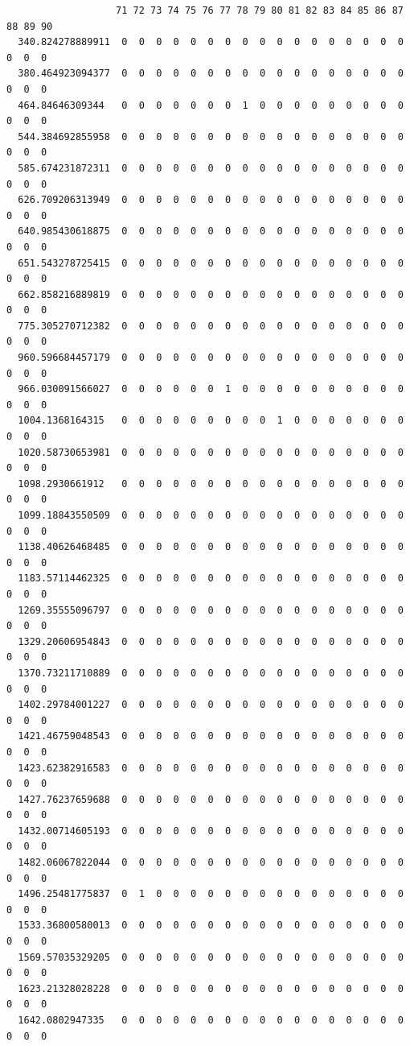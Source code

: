 \documentclass[
  letterpaper,
  DIV=11,
  numbers=noendperiod]{scrartcl}
\begin{document}
\begin{verbatim}
                   71 72 73 74 75 76 77 78 79 80 81 82 83 84 85 86 87 88 89 90
  340.824278889911  0  0  0  0  0  0  0  0  0  0  0  0  0  0  0  0  0  0  0  0
  380.464923094377  0  0  0  0  0  0  0  0  0  0  0  0  0  0  0  0  0  0  0  0
  464.84646309344   0  0  0  0  0  0  0  1  0  0  0  0  0  0  0  0  0  0  0  0
  544.384692855958  0  0  0  0  0  0  0  0  0  0  0  0  0  0  0  0  0  0  0  0
  585.674231872311  0  0  0  0  0  0  0  0  0  0  0  0  0  0  0  0  0  0  0  0
  626.709206313949  0  0  0  0  0  0  0  0  0  0  0  0  0  0  0  0  0  0  0  0
  640.985430618875  0  0  0  0  0  0  0  0  0  0  0  0  0  0  0  0  0  0  0  0
  651.543278725415  0  0  0  0  0  0  0  0  0  0  0  0  0  0  0  0  0  0  0  0
  662.858216889819  0  0  0  0  0  0  0  0  0  0  0  0  0  0  0  0  0  0  0  0
  775.305270712382  0  0  0  0  0  0  0  0  0  0  0  0  0  0  0  0  0  0  0  0
  960.596684457179  0  0  0  0  0  0  0  0  0  0  0  0  0  0  0  0  0  0  0  0
  966.030091566027  0  0  0  0  0  0  1  0  0  0  0  0  0  0  0  0  0  0  0  0
  1004.1368164315   0  0  0  0  0  0  0  0  0  1  0  0  0  0  0  0  0  0  0  0
  1020.58730653981  0  0  0  0  0  0  0  0  0  0  0  0  0  0  0  0  0  0  0  0
  1098.2930661912   0  0  0  0  0  0  0  0  0  0  0  0  0  0  0  0  0  0  0  0
  1099.18843550509  0  0  0  0  0  0  0  0  0  0  0  0  0  0  0  0  0  0  0  0
  1138.40626468485  0  0  0  0  0  0  0  0  0  0  0  0  0  0  0  0  0  0  0  0
  1183.57114462325  0  0  0  0  0  0  0  0  0  0  0  0  0  0  0  0  0  0  0  0
  1269.35555096797  0  0  0  0  0  0  0  0  0  0  0  0  0  0  0  0  0  0  0  0
  1329.20606954843  0  0  0  0  0  0  0  0  0  0  0  0  0  0  0  0  0  0  0  0
  1370.73211710889  0  0  0  0  0  0  0  0  0  0  0  0  0  0  0  0  0  0  0  0
  1402.29784001227  0  0  0  0  0  0  0  0  0  0  0  0  0  0  0  0  0  0  0  0
  1421.46759048543  0  0  0  0  0  0  0  0  0  0  0  0  0  0  0  0  0  0  0  0
  1423.62382916583  0  0  0  0  0  0  0  0  0  0  0  0  0  0  0  0  0  0  0  0
  1427.76237659688  0  0  0  0  0  0  0  0  0  0  0  0  0  0  0  0  0  0  0  0
  1432.00714605193  0  0  0  0  0  0  0  0  0  0  0  0  0  0  0  0  0  0  0  0
  1482.06067822044  0  0  0  0  0  0  0  0  0  0  0  0  0  0  0  0  0  0  0  0
  1496.25481775837  0  1  0  0  0  0  0  0  0  0  0  0  0  0  0  0  0  0  0  0
  1533.36800580013  0  0  0  0  0  0  0  0  0  0  0  0  0  0  0  0  0  0  0  0
  1569.57035329205  0  0  0  0  0  0  0  0  0  0  0  0  0  0  0  0  0  0  0  0
  1623.21328028228  0  0  0  0  0  0  0  0  0  0  0  0  0  0  0  0  0  0  0  0
  1642.0802947335   0  0  0  0  0  0  0  0  0  0  0  0  0  0  0  0  0  0  0  0

\end{verbatim}
\end{document}
